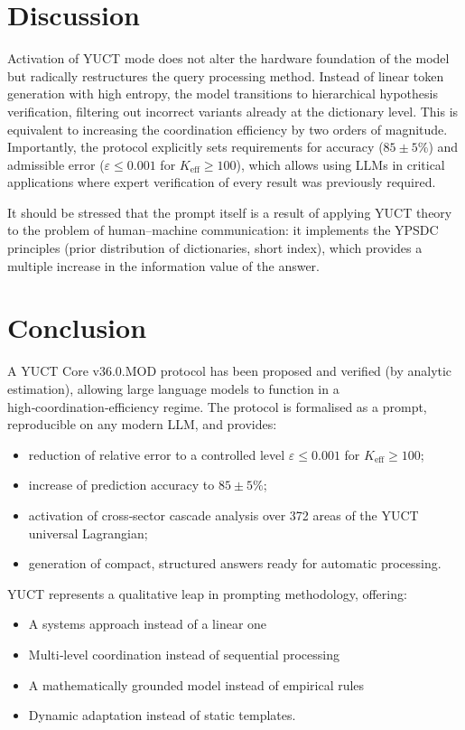 \documentclass[12pt,a4paper]{article}
\begin{document}
	\section{Discussion}
	\normalsize
	Activation of YUCT mode does not alter the hardware foundation of the model but radically restructures the query processing method. Instead of linear token generation with high entropy, the model transitions to hierarchical hypothesis verification, filtering out incorrect variants already at the dictionary level. This is equivalent to increasing the coordination efficiency by two orders of magnitude. Importantly, the protocol explicitly sets requirements for accuracy (\(85\pm5\%\)) and admissible error (\(\varepsilon\le 0.001\) for \(K_{\mathrm{eff}}\ge 100\)), which allows using LLMs in critical applications where expert verification of every result was previously required.
	
	It should be stressed that the prompt itself is a result of applying YUCT theory to the problem of human–machine communication: it implements the YPSDC principles (prior distribution of dictionaries, short index), which provides a multiple increase in the information value of the answer.
	
	\section{Conclusion}
	A YUCT Core v36.0.MOD protocol has been proposed and verified (by analytic estimation), allowing large language models to function in a high‑coordination‑efficiency regime. The protocol is formalised as a prompt, reproducible on any modern LLM, and provides:
	\begin{itemize}
		\item reduction of relative error to a controlled level \(\varepsilon \le 0.001\) for \(K_{\mathrm{eff}}\ge 100\);
		\item increase of prediction accuracy to \(85\pm5\%\);
		\item activation of cross‑sector cascade analysis over 372 areas of the YUCT universal Lagrangian;
		\item generation of compact, structured answers ready for automatic processing.
	\end{itemize}
	
	YUCT represents a qualitative leap in prompting methodology, offering:
	\begin{itemize}
		\item A systems approach instead of a linear one
		\item Multi‑level coordination instead of sequential processing
		\item A mathematically grounded model instead of empirical rules
		\item Dynamic adaptation instead of static templates.
	\end{itemize}
	
\end{document}

